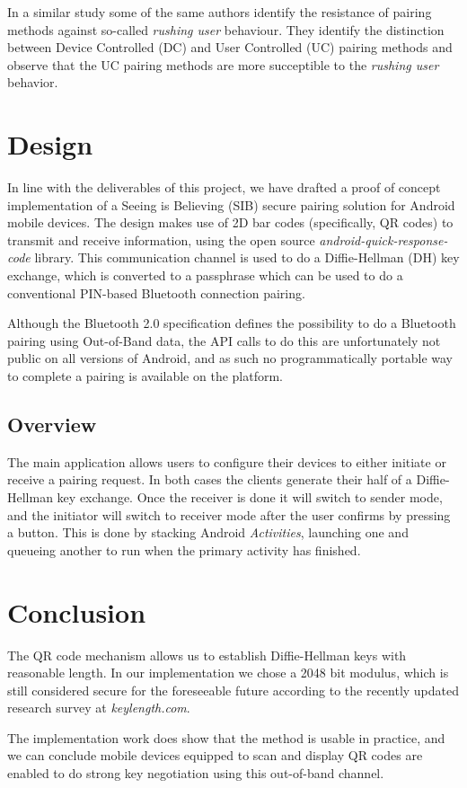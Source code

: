 \documentclass[conference, 12pt]{sty/IEEEtran}
\begin{document}
In a similar study \cite{kobsa2009serial} some of the same authors identify the resistance of pairing methods against so-called \textit{rushing user} behaviour.
They identify the distinction between Device Controlled (DC) and User Controlled (UC) pairing methods and observe that the UC pairing methods are more succeptible to the \textit{rushing user} behavior.

\section{Design}
\label{sec:design}
In line with the deliverables of this project, we have drafted a proof of concept implementation of a Seeing is Believing (SIB) secure pairing solution for Android mobile devices.
The design makes use of 2D bar codes (specifically, QR codes) to transmit and receive information, using the open source \textit{android-quick-response-code}\cite{aqrc} library.
This communication channel is used to do a Diffie-Hellman (DH) key exchange, which is converted to a passphrase which can be used to do a conventional PIN-based Bluetooth connection pairing.

Although the Bluetooth 2.0 specification defines the possibility to do a Bluetooth pairing using Out-of-Band data, the API calls to do this are unfortunately not public on all versions of Android, and as such no programmatically portable way to complete a pairing is available on the platform.

\subsection{Overview}
\label{ssec:overview}
The main application allows users to configure their devices to either initiate or receive a pairing request.
In both cases the clients generate their half of a Diffie-Hellman key exchange.
Once the receiver is done it will switch to sender mode, and the initiator will switch to receiver mode after the user confirms by pressing a button.
This is done by stacking Android \textit{Activities}, launching one and queueing another to run when the primary activity has finished.

\section{Conclusion}
\label{sec:conclusion}
The QR code mechanism allows us to establish Diffie-Hellman keys with reasonable length. In our implementation we chose a 2048 bit modulus, which is still considered secure for the foreseeable future according to the recently updated research survey at \textit{keylength.com}\cite{keylengthdotcom}.

The implementation work does show that the method is usable in practice, and we can conclude mobile devices equipped to scan and display QR codes are enabled to do strong key negotiation using this out-of-band channel.



\end{document}
